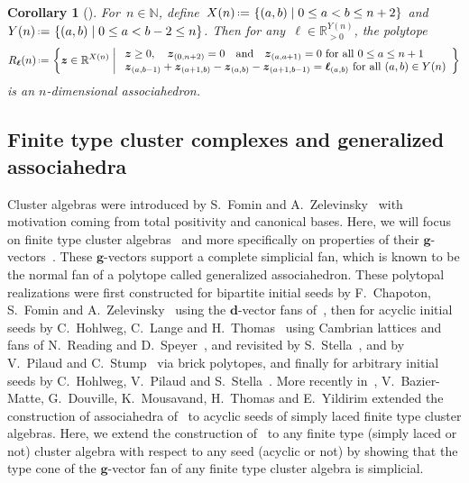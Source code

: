 \documentclass{amsart}
\newtheorem{corollary}[theorem]{Corollary}
\theoremstyle{definition}
\newcommand{\R}{\mathbb{R}} %
\newcommand{\N}{\mathbb{N}} %
\renewcommand{\b}[1]{{\boldsymbol{#1}}} %
\newcommand{\set}[2]{\left\{ #1 \;\middle|\; #2 \right\}} %
\newcommand{\bigset}[2]{\big\{ #1 \;\big|\; #2 \big\}} %
\newcommand{\eqdef}{\mbox{\,\raisebox{0.2ex}{\scriptsize\ensuremath{\mathrm:}}\ensuremath{=}\,}} %
\begin{document}
\begin{corollary}[{\cite[Sect.~3.2]{ArkaniHamedBaiHeYan}}]
For~$n \in \N$, define~$X(n) \eqdef \set{(a,b)}{0 \le a < b \le n+2}$ and~$Y(n) \eqdef \set{(a,b)}{0 \le a < b-2 \le n}$.
Then for any~$\b{\ell} \in \R_{>0}^{Y(n)}$, the polytope
\[
R_\b{\ell}(n) \eqdef \set{\b{z} \in \R^{X(n)}}{\begin{array}{l} \b{z} \ge 0, \quad \b{z}_{(0,n+2)} = 0 \quad\text{and}\quad \b{z}_{(a,a+1)} = 0 \text{ for all } 0 \le a \le n+1 \\ \b{z}_{(a,b-1)} + \b{z}_{(a+1,b)} - \b{z}_{(a,b)} - \b{z}_{(a+1,b-1)} = \b{\ell}_{(a,b)} \text{ for all } (a,b) \in Y(n) \end{array}}
\]
is an $n$-dimensional associahedron.
\end{corollary}


\subsection{Finite type cluster complexes and generalized associahedra}

Cluster algebras were introduced by S.~Fomin and A.~Zelevinsky~\cite{FominZelevinsky-ClusterAlgebrasI} with motivation coming from total positivity and canonical bases.
Here, we will focus on finite type cluster algebras~\cite{FominZelevinsky-ClusterAlgebrasII} and more specifically on properties of their $\b{g}$-vectors~\cite{FominZelevinsky-ClusterAlgebrasIV}.
These $\b{g}$-vectors support a complete simplicial fan, which is known to be the normal fan of a polytope called generalized associahedron. These polytopal realizations were first constructed for bipartite initial seeds by F.~Chapoton, S.~Fomin and A.~Zelevinsky~\cite{ChapotonFominZelevinsky} using the $\b{d}$-vector fans of~\cite{FominZelevinsky-YSystems}, then for acyclic initial seeds by C.~Hohlweg, C.~Lange and H.~Thomas~\cite{HohlwegLangeThomas} using Cambrian lattices and fans of N.~Reading and D.~Speyer~\cite{Reading-CambrianLattices, ReadingSpeyer}, and revisited by S.~Stella~\cite{Stella}, and by V.~Pilaud and C.~Stump~\cite{PilaudStump-brickPolytope} via brick polytopes, and finally for arbitrary initial seeds by C.~Hohlweg, V.~Pilaud and S.~Stella~\cite{HohlwegPilaudStella}.
More recently in~\cite{BazierMatteDouvilleMousavandThomasYildirim}, V.~Bazier-Matte, G.~Douville, K.~Mousavand, H.~Thomas and E.~Yildirim extended the construction of associahedra of~\cite[Sect.~3.2]{ArkaniHamedBaiHeYan} to acyclic seeds of simply laced finite type cluster algebras.
Here, we extend the construction of~\cite[Sect.~3.2]{ArkaniHamedBaiHeYan} to any finite type (simply laced or not) cluster algebra with respect to any seed (acyclic or not) by showing that the type cone of the $\b{g}$-vector fan of any finite type cluster algebra is simplicial.
\end{document}

